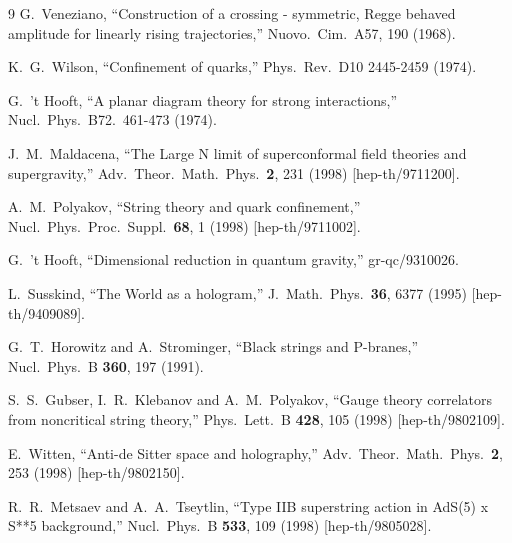 \documentclass[a4paper,11pt]{article}
\numberwithin{equation}{section}
\begin{document}
\begin{thebibliography} {9}
  G.~Veneziano, 
  ``Construction of a crossing - symmetric, Regge behaved amplitude for linearly rising trajectories,'' 
  Nuovo.\ Cim.\ A57, 190 (1968).

  K.~G.~Wilson,
  ``Confinement of quarks,''
  Phys.\ Rev.\ D10 2445-2459 (1974).

  G.~'t Hooft, 
  ``A planar diagram theory for strong interactions,'' 
  Nucl.\ Phys.\ B72.\ 461-473 (1974).

  J.~M.~Maldacena,
  ``The Large N limit of superconformal field theories and supergravity,''
  Adv.\ Theor.\ Math.\ Phys.\  {\bf 2}, 231 (1998)
  [hep-th/9711200].

  A.~M.~Polyakov,
  ``String theory and quark confinement,''
  Nucl.\ Phys.\ Proc.\ Suppl.\  {\bf 68}, 1 (1998)
  [hep-th/9711002].

  G.~'t Hooft,
  ``Dimensional reduction in quantum gravity,''
  gr-qc/9310026.

  L.~Susskind,
  ``The World as a hologram,''
  J.\ Math.\ Phys.\  {\bf 36}, 6377 (1995)
  [hep-th/9409089].

  G.~T.~Horowitz and A.~Strominger,
  ``Black strings and P-branes,''
  Nucl.\ Phys.\ B {\bf 360}, 197 (1991).

  S.~S.~Gubser, I.~R.~Klebanov and A.~M.~Polyakov,
  ``Gauge theory correlators from noncritical string theory,''
  Phys.\ Lett.\ B {\bf 428}, 105 (1998)
  [hep-th/9802109].

  E.~Witten,
  ``Anti-de Sitter space and holography,''
  Adv.\ Theor.\ Math.\ Phys.\  {\bf 2}, 253 (1998)
  [hep-th/9802150].

  R.~R.~Metsaev and A.~A.~Tseytlin,
  ``Type IIB superstring action in AdS(5) x S**5 background,''
  Nucl.\ Phys.\ B {\bf 533}, 109 (1998)
  [hep-th/9805028].


\end{thebibliography}
\end{document}
